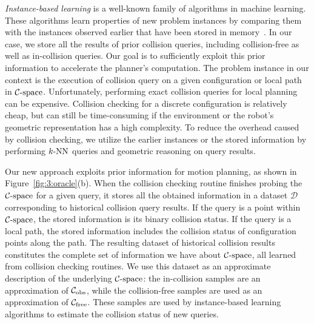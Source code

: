\emph{Instance-based learning} is a well-known family of algorithms in machine learning. These algorithms learn properties of new problem instances by comparing them with the instances observed earlier that have been stored in memory~\cite{Russell:2003}. In our case, we store all the results of prior collision queries, including collision-free as well as in-collision queries. Our goal is to sufficiently exploit this prior information to accelerate the planner's computation. The problem instance in our context is the execution of collision query on a given configuration or local path in $\mathcal C\text{-space}$. Unfortunately, performing exact collision queries for local planning can be expensive. Collision checking for a discrete configuration is relatively cheap, but can still be time-consuming if the environment or the robot's geometric representation has a high complexity. To reduce the overhead caused by collision checking, we utilize the earlier instances or the stored information by performing $k\text{-NN}$ queries and geometric reasoning on query results.

Our new approach exploits prior information for motion planning, as shown in Figure~\ref{fig:3:oracle}(b). When the collision checking routine finishes probing the $\mathcal C\text{-space}$ for a given query, it stores all the obtained information in a dataset $\mathcal D$ corresponding to historical collision query results. If the query is a point within $\mathcal C\text{-space}$, the stored information is its binary collision status. If the query is a local path, the stored information includes the collision status of configuration points along the path. The resulting dataset of historical collision results constitutes the complete set of information we have about $\mathcal C\text{-space}$, all learned from collision checking routines. We use this dataset as an approximate description of the underlying $\mathcal C\text{-space}$: the in-collision samples are an approximation of $\mathcal C_{\text{obs}}$, while the collision-free samples are used as an approximation of $\mathcal C_{\text{free}}$. These samples are used by instance-based learning algorithms to estimate the collision status of new queries.

